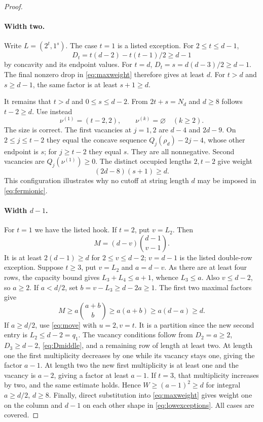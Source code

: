 \documentclass[11pt]{article}
\theoremstyle{remark}\newtheorem{remark}[theorem]{Remark}
\numberwithin{equation}{section}\setlength{\emergencystretch}{2em}
\begin{document}
\begin{proof}
\paragraph{Width two.}
Write $L=(2^t,1^s)$. The case $t=1$ is a listed exception.
For $2\le t\le d-1$,
\[
 D_t=t(d-2)-t(t-1)/2\ge d-1
\]
by concavity and its endpoint values. For $t=d$,
$D_t=s=d(d-3)/2\ge d-1$. The final nonzero drop in
\eqref{eq:maxweight} therefore gives at least $d$.
For $t>d$ and $s\ge d-1$, the same factor is at least $s+1\ge d$.

It remains that $t>d$ and $0\le s\le d-2$. From $2t+s=N_d$ and
$d\ge8$ follows $t-2\ge d$. Use instead
\[
 \nu^{(1)}=(t-2,2),\qquad \nu^{(k)}=\varnothing\quad(k\ge2).
\]
The size is correct. The first vacancies at $j=1,2$ are $d-4$ and
$2d-9$. On $2\le j\le t-2$ they equal the concave sequence
$Q_j(\rho_d)-2j-4$, whose other endpoint is $s$; for $j\ge t-2$
they equal $s$. They are all nonnegative. Second vacancies are
$Q_j(\nu^{(1)})\ge0$. The distinct occupied lengths $2,t-2$ give weight
\[
 (2d-8)(s+1)\ge d.
\]
This configuration illustrates why no cutoff at string length $d$ may
be imposed in \eqref{eq:fermionic}.

\paragraph{Width $d-1$.}
For $t=1$ we have the listed hook. If $t=2$, put $v=L_2$. Then
\[
 M=(d-v)\binom{d-1}{v-1}.
\]
It is at least $2(d-1)\ge d$ for $2\le v\le d-2$; $v=d-1$ is
the listed double-row exception.
Suppose $t\ge3$, put $v=L_2$ and $a=d-v$. As there are at least four
rows, the capacity bound gives $L_3+L_4\le a+1$, whence $L_3\le a$.
Also $v\le d-2$, so $a\ge2$.
If $a<d/2$, set $b=v-L_3\ge d-2a\ge1$. The first two maximal
factors give
\[
 M\ge a\binom{a+b}{b}\ge a(a+b)\ge a(d-a)\ge d.
\]
If $a\ge d/2$, use \eqref{eq:move} with $u=2,v=t$.
It is a partition since the new second entry is $L_2\le d-2=q_1$.
The vacancy conditions follow from $D_2=a\ge2$, $D_3\ge d-2$,
\eqref{eq:Dmiddle}, and a remaining row of length at least two.
At length one the first multiplicity decreases by one while its vacancy
stays one, giving the factor $a-1$. At length two the new first
multiplicity is at least one and the vacancy is $a-2$, giving a factor
at least $a-1$. If $t=3$, that multiplicity increases by two, and the
same estimate holds. Hence $W\ge(a-1)^2\ge d$ for integral
$a\ge d/2$, $d\ge8$.
Finally, direct substitution into \eqref{eq:maxweight} gives weight one
on the column and $d-1$ on each other shape in \eqref{eq:lowexceptions}.
All cases are covered.
\end{proof}
\end{document}
